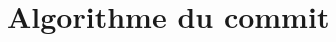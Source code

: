 \documentclass[a4paper]{report}
\begin{document}





\section{Algorithme du commit}
\end{document}
